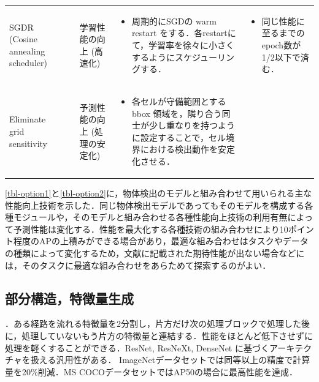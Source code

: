 \documentclass[originalpaper,fleqn]{jsaiart}     %
\begin{document}
\begin{table}
\begin{center}
\begin{tabularx}{\linewidth}{Xp{1.5cm}Xp{7cm}X}
            SGDR (Cosine annealing scheduler) & \cite{LoshHut17} & 学習性能の向上 (高速化) & 
            \begin{itemize}
                \vspace{-0.7\baselineskip}
                \setlength{\leftskip}{-3mm}
                \item 周期的にSGDの warm restart をする．各restartにて，学習率を徐々に小さくするようにスケジューリングする．
            \end{itemize}
            &
            \begin{itemize}
                \vspace{-0.7\baselineskip}
                \setlength{\leftskip}{-3mm}
                \item 同じ性能に至るまでのepoch数が1/2以下で済む．
            \end{itemize}
            \\

            Eliminate grid sensitivity
            & \cite{BWL20} & 予測性能の向上 (処理の安定化) & 
            \begin{itemize}
                \vspace{-0.7\baselineskip}
                \setlength{\leftskip}{-3mm}
                \item 各セルが守備範囲とする bbox 領域を，隣り合う同士が少し重なりを持つように設定することで，セル境界における検出動作を安定化させる．
            \end{itemize}
            &
            \\
            \bottomrule
        \end{tabularx}
    \end{center}
\end{table}%

\ref{tbl-option1}と\ref{tbl-option2}に，物体検出のモデルと組み合わせて用いられる主な性能向上技術を示した．同じ物体検出モデルであってもそのモデルを構成する各種モジュールや，そのモデルと組み合わせる各種性能向上技術の利用有無によって予測性能は変化する．性能を最大化する各種技術の組み合わせにより10ポイント程度のAPの上積みができる場合があり，最適な組み合わせはタスクやデータの種類によって変化するため，文献に記載された期待性能が出ない場合などには，そのタスクに最適な組み合わせをあらためて探索するのがよい．

\subsection{部分構造，特徴量生成}
\cite{WLWCHY20}．ある経路を流れる特徴量を2分割し，片方だけ次の処理ブロックで処理した後に，処理していないもう片方の特徴量と連結する．性能をほとんど低下させずに処理を軽くすることができる．ResNet, ResNeXt, DenseNet に基づくアーキテクチャを扱える汎用性がある．
ImageNetデータセットでは同等以上の精度で計算量を20\%削減．MS COCOデータセットではAP50の場合に最高性能を達成．
\end{document}
